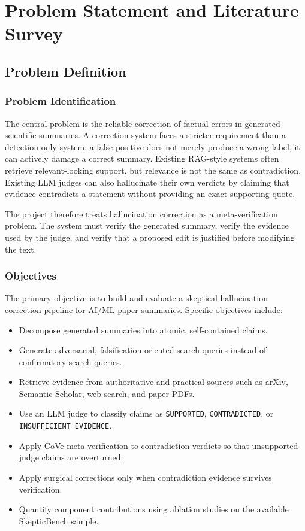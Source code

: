 \documentclass[12pt, a4paper]{report}
\begin{document}
\chapter{Problem Statement and Literature Survey}

\section{Problem Definition}

\subsection{Problem Identification}

The central problem is the reliable correction of factual errors in generated
scientific summaries. A correction system faces a stricter requirement than a
detection-only system: a false positive does not merely produce a wrong label,
it can actively damage a correct summary. Existing RAG-style systems often
retrieve relevant-looking support, but relevance is not the same as
contradiction. Existing LLM judges can also hallucinate their own verdicts by
claiming that evidence contradicts a statement without providing an exact
supporting quote.

The project therefore treats hallucination correction as a meta-verification
problem. The system must verify the generated summary, verify the evidence used
by the judge, and verify that a proposed edit is justified before modifying the
text.

\subsection{Objectives}

The primary objective is to build and evaluate a skeptical hallucination
correction pipeline for AI/ML paper summaries. Specific objectives include:

\begin{itemize}
    \item Decompose generated summaries into atomic, self-contained claims.
    \item Generate adversarial, falsification-oriented search queries instead of confirmatory search queries.
    \item Retrieve evidence from authoritative and practical sources such as arXiv, Semantic Scholar, web search, and paper PDFs.
    \item Use an LLM judge to classify claims as \texttt{SUPPORTED}, \texttt{CONTRADICTED}, or \texttt{INSUFFICIENT\_EVIDENCE}.
    \item Apply CoVe meta-verification to contradiction verdicts so that unsupported judge claims are overturned.
    \item Apply surgical corrections only when contradiction evidence survives verification.
    \item Quantify component contributions using ablation studies on the available SkepticBench sample.
\end{itemize}
\end{document}
